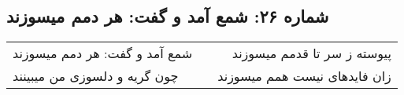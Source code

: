 \begin{center}
\section*{شماره ۲۶: شمع آمد و گفت: هر دمم میسوزند}
\label{sec:026}
\begin{longtable}{l p{0.5cm} r}
شمع آمد و گفت: هر دمم میسوزند
&&
پیوسته ز سر تا قدمم میسوزند
\\
چون گریه و دلسوزی من میبینند
&&
زان فایدهای نیست همم میسوزند
\\
\end{longtable}
\end{center}
